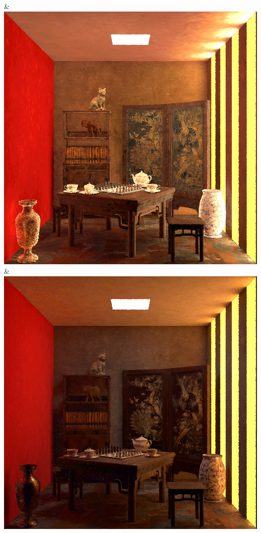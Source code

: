 & \includegraphics[width=\linewidth]{figures/py/tests/quality_comparison/nrc+lt+bal_1spp_chess.png}
& \includegraphics[width=\linewidth]{figures/py/tests/quality_comparison/nrc+sppc_1spp_chess.png}
